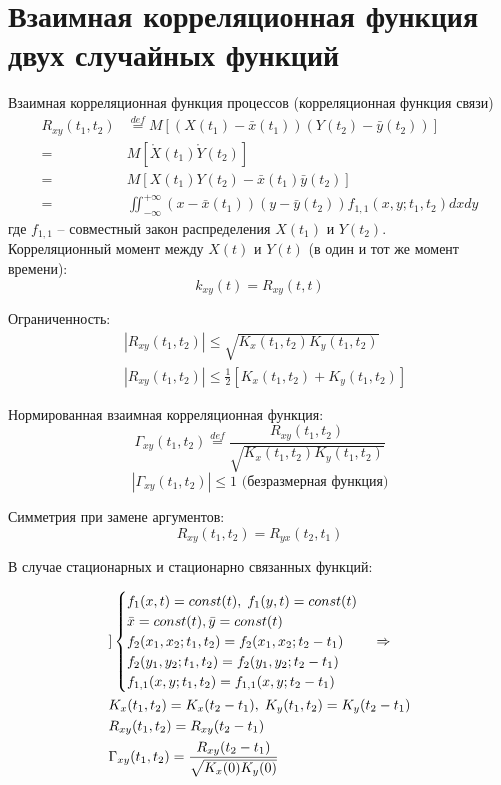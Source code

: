\documentclass[a4paper,11pt, twocolumn]{article}
\newcommand{\defeq}{\overset{def}=}
\begin{document}
\section{Взаимная корреляционная функция двух случайных функций}

Взаимная корреляционная функция процессов (корреляционная функция связи)
\begin{align*}
    R_{xy}(t_1,t_2) & \defeq M[( X(t_1) - \bar x(t_1) )( Y(t_2) - \bar y(t_2) )] \\
    = & M[ \mathring X(t_1) \mathring Y(t_2) ] \\
    = & M[X(t_1)Y(t_2) - \bar x(t_1) \bar y(t_2) ] \\
    = & \iint_{-\infty}^{+\infty} (x - \bar x(t_1))(y - \bar y(t_2)) f_{1,1}(x,y; t_1,t_2) dxdy
\end{align*}
где $ f_{1,1} $ -- совместный закон распределения $ X(t_1) $ и $ Y(t_2) $. \\

Корреляционный момент между $ X(t) $ и $ Y(t) $ (в один и тот же момент времени):
$$ k_{xy}(t) = R_{xy}(t,t) $$

Ограниченность:
\begin{align*}
    & |R_{xy}(t_1, t_2)| \le \sqrt{K_x(t_1, t_2) K_y(t_1, t_2)} \\
    & |R_{xy}(t_1, t_2)| \le \frac{1}{2} \left[ K_x(t_1, t_2) + K_y(t_1, t_2) \right]
\end{align*}

Нормированная взаимная корреляционная функция:
$$ \Gamma_{xy}(t_1, t_2) \defeq \frac{R_{xy}(t_1, t_2)}{\sqrt{K_x(t_1, t_2) K_y(t_1, t_2)}} $$
$$ |\Gamma_{xy}(t_1,t_2)| \le 1 \text{ (безразмерная функция)} $$

Симметрия при замене аргументов:
$$ R_{xy}(t_1, t_2) = R_{yx}(t_2, t_1) $$

В случае стационарных и стационарно связанных функций:

\begin{align*}
    & ] \begin{cases}
        f_1(x,t) = const(t), \thickspace f_1(y,t) = const(t) \\
        \bar x = const(t), \bar y = const(t) \\
        f_2(x_1, x_2; t_1, t_2) = f_2 (x_1, x_2; t_2 - t_1) \\
        f_2(y_1, y_2; t_1, t_2) = f_2 (y_1, y_2; t_2 - t_1) \\
        f_{1,1}(x,y; t_1, t_2) = f_{1,1}(x,y; t_2 - t_1) \\
    \end{cases} \Rightarrow \\
    & K_x(t_1, t_2) = K_x(t_2 - t_1), \thickspace K_y(t_1, t_2) = K_y(t_2 - t_1) \\
    & R_{xy}(t_1, t_2) = R_{xy}(t_2 - t_1) \\
    & \Gamma_{xy}(t_1, t_2) = \frac{R_{xy}(t_2 - t_1)}{\sqrt{K_x(0)K_y(0)}} \\
\end{align*}
\end{document}
